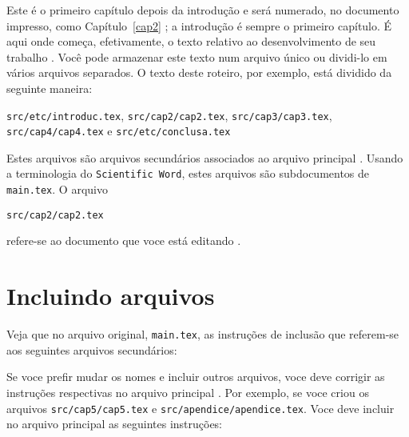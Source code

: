 
Este é o primeiro capítulo depois da introdução e será numerado, no documento impresso, como Capítulo~\ref{cap2} \cite{taylor}; a introdução é sempre o primeiro capítulo. É aqui onde começa, efetivamente, o texto relativo ao desenvolvimento de seu trabalho \cite{etex}. Você pode armazenar este texto num arquivo único ou dividi-lo em
vários arquivos separados. O texto deste roteiro, por exemplo,
está dividido da seguinte maneira:

\noindent\texttt{src/etc/introduc.tex}, \texttt{src/cap2/cap2.tex},
\texttt{src/cap3/cap3.tex}, \texttt{src/cap4/cap4.tex} e \texttt{src/etc/conclusa.tex}

Estes arquivos são arquivos secundários associados ao arquivo
principal \cite{AbTaRu:54}. Usando a terminologia do \texttt{Scientific Word},
estes arquivos são subdocumentos de \texttt{main.tex}. O arquivo
\begin{verbatim}
src/cap2/cap2.tex
\end{verbatim}
refere-se ao documento que voce está editando
\cite{IEEEexample:masterstype}.

\section{Incluindo arquivos}

Veja que no arquivo original, \texttt{main.tex}, as instruções de
inclusão que referem-se aos seguintes arquivos secundários:

\noindent\verb||

\noindent\verb||

\noindent\verb||

Se voce prefir mudar os nomes e incluir outros arquivos, voce deve
corrigir as instruções respectivas no arquivo principal
\cite{IEEEexample:phdurl}. Por exemplo, se voce criou os arquivos
\texttt{src/cap5/cap5.tex} e \texttt{src/apendice/apendice.tex}. Voce deve incluir no arquivo principal as seguintes instruções:

\noindent\verb||

\noindent\verb||

